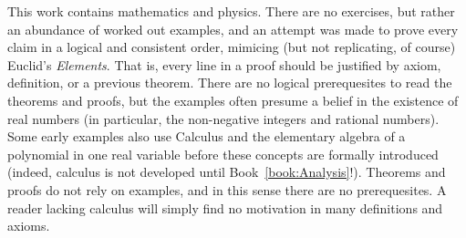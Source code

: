 This work contains mathematics and physics. There are no exercises, but rather
an abundance of worked out examples, and an attempt was made to prove
every claim in a logical and consistent order, mimicing (but not replicating,
of course) Euclid's \textit{Elements}. That is, every line in a proof should be
justified by axiom, definition, or a previous theorem. There are no logical
prerequesites to read the theorems and proofs, but the examples often presume
a belief in the existence of real numbers (in particular, the non-negative
integers and rational numbers). Some early examples also use Calculus and the
elementary algebra of a polynomial in one real variable before these concepts
are formally introduced (indeed, calculus is not developed until
Book~\ref{book:Analysis}!). Theorems and proofs do not rely on examples, and in
this sense there are no prerequesites. A reader lacking calculus will simply
find no motivation in many definitions and axioms.